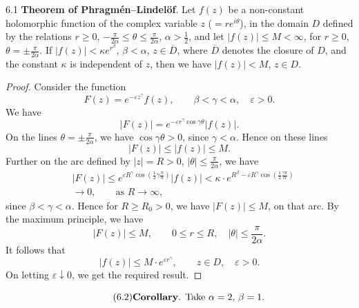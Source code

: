 \begin{nstmt}{6.1}\label{eq:II-6.1}
\textbf{Theorem of Phragm\'en--Lindel\"of}. Let $f(z)$ be a non-constant holomorphic function of the complex variable $z$ ($=re^{i\theta}$), in the domain $D$ defined by the relations $r\ge 0$, $-\frac{\pi}{2\alpha}\le\theta\le\frac{\pi}{2\alpha}$, $\alpha>\frac{1}{2}$, and let $|f(z)|\le M<\infty$, for $r\ge 0$, $\theta=\pm\frac{\pi}{2\alpha}$. If $|f(z)|<\kappa e^{r^{\beta}}$, $\beta<\alpha$, $z\in\overline{D}$, where $\overline{D}$ denotes the closure of $D$, and the constant $\kappa$ is independent of $z$, then we have $|f(z)|<M$, $z\in D$.
\end{nstmt}
\begin{proof}
Consider the function
\[
F(z)=e^{-\varepsilon z^{\gamma}}f(z),\qquad \beta<\gamma<\alpha,\quad \varepsilon>0.
\]
We have
\[
|F(z)|=e^{-\varepsilon r^{\gamma}\cos\gamma\theta}|f(z)|.
\]
On the lines $\theta=\pm\frac{\pi}{2\alpha}$, we have $\cos\gamma\theta>0$, since $\gamma<\alpha$. Hence on these lines
\[
|F(z)|\le |f(z)|\le M.
\]
Further on the arc defined by $|z|=R>0$, $|\theta|\le\frac{\pi}{2\alpha}$, we have
\[
\begin{aligned}
&|F(z)| \le e^{\varepsilon R^{\gamma}\cos(\frac{1}{2}\gamma\frac{\pi}{\alpha})}|f(z)| < \kappa\cdot e^{R^{\beta}-\varepsilon R^{\gamma}\cos(\frac{1}{2}\frac{\gamma\pi}{\alpha})}\\
&\to 0,  \qquad\text{as }R \to \infty,
\end{aligned}
\]
since $\beta<\gamma<\alpha$. Hence for $R\ge R_{0}>0$, we have $|F(z)|\le M$, on that arc. By the maximum principle, we have
\[
|F(z)|\le M,\qquad 0\le r\le R,\quad |\theta|\le\frac{\pi}{2\alpha}.
\]
It follows that
\[
|f(z)|\le M\cdot e^{\varepsilon r^{\gamma}},\qquad z\in D,\quad \varepsilon>0.
\]
On letting $\varepsilon\downarrow 0$, we get the required result.
\end{proof}

\begin{equation*}\tag{6.2}\label{eq:II-6.2}
\text{\textbf{Corollary}. Take $\alpha=2$, $\beta=1$.}
\end{equation*}

